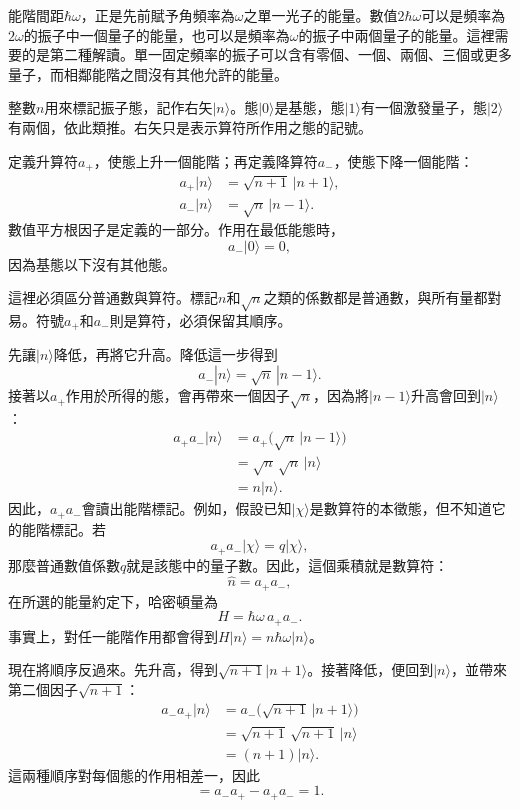 能階間距\(\hbar\omega\)，正是先前賦予角頻率為\(\omega\)之單一光子的能量。數值\(2\hbar\omega\)可以是頻率為\(2\omega\)的振子中一個量子的能量，也可以是頻率為\(\omega\)的振子中兩個量子的能量。這裡需要的是第二種解讀。單一固定頻率的振子可以含有零個、一個、兩個、三個或更多量子，而相鄰能階之間沒有其他允許的能量。

整數\(n\)用來標記振子態，記作右矢\(|n\rangle\)。態\(|0\rangle\)是基態，態\(|1\rangle\)有一個激發量子，態\(|2\rangle\)有兩個，依此類推。右矢只是表示算符所作用之態的記號。

定義升算符\(a_+\)，使態上升一個能階；再定義降算符\(a_-\)，使態下降一個能階：
\begin{align}
a_+|n\rangle &= \sqrt{n+1}\,|n+1\rangle,\\
a_-|n\rangle &= \sqrt{n}\,|n-1\rangle.
\end{align}
數值平方根因子是定義的一部分。作用在最低能態時，
\begin{equation}
a_-|0\rangle=0,
\end{equation}
因為基態以下沒有其他態。

這裡必須區分普通數與算符。標記\(n\)和\(\sqrt n\)之類的係數都是普通數，與所有量都對易。符號\(a_+\)和\(a_-\)則是算符，必須保留其順序。

先讓\(|n\rangle\)降低，再將它升高。降低這一步得到
\begin{equation}
a_-|n\rangle=\sqrt n\,|n-1\rangle.
\end{equation}
接著以\(a_+\)作用於所得的態，會再帶來一個因子\(\sqrt n\)，因為將\(|n-1\rangle\)升高會回到\(|n\rangle\)：
\begin{align}
a_+a_-|n\rangle
&=a_+\bigl(\sqrt n\,|n-1\rangle\bigr)\\
&=\sqrt n\,\sqrt n\,|n\rangle\\
&=n|n\rangle.
\end{align}
因此，\(a_+a_-\)會讀出能階標記。例如，假設已知\(|\chi\rangle\)是數算符的本徵態，但不知道它的能階標記。若
\begin{equation}
a_+a_-|\chi\rangle=q|\chi\rangle,
\end{equation}
那麼普通數值係數\(q\)就是該態中的量子數。因此，這個乘積就是數算符：
\begin{equation}
\hat n=a_+a_-,
\end{equation}
在所選的能量約定下，哈密頓量為
\begin{equation}
H=\hbar\omega\,a_+a_-.
\end{equation}
事實上，對任一能階作用都會得到\(H|n\rangle=n\hbar\omega|n\rangle\)。

現在將順序反過來。先升高，得到\(\sqrt{n+1}|n+1\rangle\)。接著降低，便回到\(|n\rangle\)，並帶來第二個因子\(\sqrt{n+1}\)：
\begin{align}
a_-a_+|n\rangle
&=a_-\bigl(\sqrt{n+1}\,|n+1\rangle\bigr)\\
&=\sqrt{n+1}\,\sqrt{n+1}\,|n\rangle\\
&=(n+1)|n\rangle.
\end{align}
這兩種順序對每個態的作用相差一，因此
\begin{equation}
[a_-,a_+]=a_-a_+-a_+a_-=1.
\end{equation}

